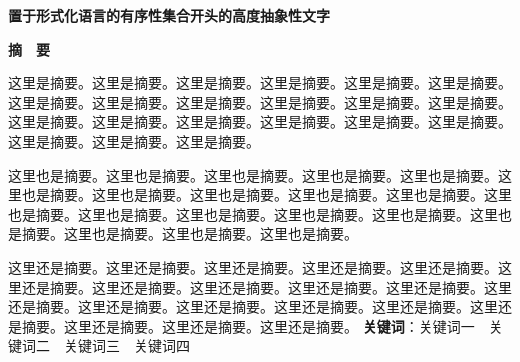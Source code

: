 \thispagestyle{empty}   %

\begin{center}
    \textbf{\fontsize{20}{1.5}置于形式化语言的有序性集合开头的高度抽象性文字}

    \textbf{摘　要}
\end{center}





%
%

这里是摘要。这里是摘要。这里是摘要。这里是摘要。这里是摘要。这里是摘要。这里是摘要。这里是摘要。这里是摘要。这里是摘要。这里是摘要。这里是摘要。这里是摘要。这里是摘要。这里是摘要。这里是摘要。这里是摘要。这里是摘要。这里是摘要。这里是摘要。这里是摘要。

这里也是摘要。这里也是摘要。这里也是摘要。这里也是摘要。这里也是摘要。这里也是摘要。这里也是摘要。这里也是摘要。这里也是摘要。这里也是摘要。这里也是摘要。这里也是摘要。这里也是摘要。这里也是摘要。这里也是摘要。这里也是摘要。这里也是摘要。这里也是摘要。这里也是摘要。

这里还是摘要。这里还是摘要。这里还是摘要。这里还是摘要。这里还是摘要。这里还是摘要。这里还是摘要。这里还是摘要。这里还是摘要。这里还是摘要。这里还是摘要。这里还是摘要。这里还是摘要。这里还是摘要。这里还是摘要。这里还是摘要。这里还是摘要。这里还是摘要。这里还是摘要。\newline
\newline
\textbf{关键词}：关键词一　关键词二　关键词三　关键词四
